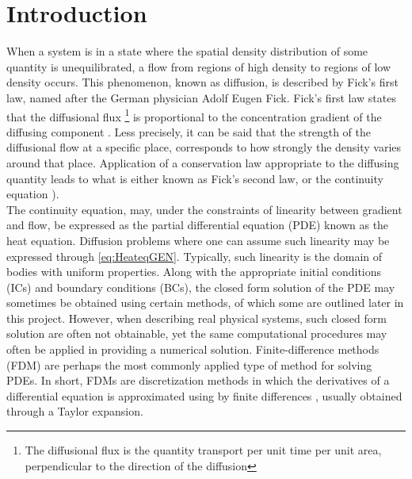\documentclass[%
oneside,                 %
final,                   %
10pt]{article}
\begin{document}
\section{Introduction}
When a system is in a state where the spatial density distribution of some quantity is unequilibrated, a flow from regions of high density to regions of low density occurs. This phenomenon, known as diffusion, is described by Fick's first law, named after the German physician Adolf Eugen Fick. Fick's first law states that the diffusional flux \footnote{The diffusional flux is the quantity transport per unit time per unit area, perpendicular to the direction of the diffusion} is proportional to the concentration gradient of the diffusing component \citep[pp. 339-340]{MatSci}. Less precisely, it can be said that the strength of the diffusional flow at a specific place, corresponds to how strongly the density varies around that place. Application of a conservation law appropriate to the diffusing quantity leads to what is either known as Fick's second law, or the continuity equation \citep[pp.341-342]{MatSci}). \\
The continuity equation, may, under the constraints of linearity between gradient and flow, be expressed as the partial differential equation (PDE) known as the heat equation. Diffusion problems where one can assume such linearity may be expressed through \eqref{eq:HeateqGEN}. Typically, such linearity is the domain of bodies with uniform properties. Along with the appropriate initial conditions (ICs) and boundary conditions (BCs), the closed form solution of the PDE may sometimes be obtained using certain methods, of which some are outlined later in this project. However, when describing real physical systems, such closed form solution are often not obtainable, yet the same computational procedures may often be applied in providing a numerical solution. Finite-difference methods (FDM) are perhaps the most commonly applied type of method for solving PDEs. In short, FDMs are discretization methods in which the derivatives of a differential equation is approximated using by finite differences \citep[p. 46]{compPDE}, usually obtained through a Taylor expansion. 
\end{document}
